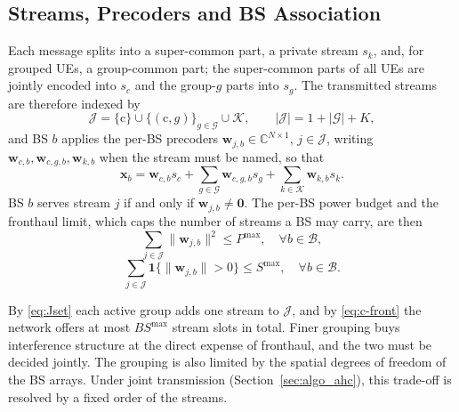 \subsection{Streams, Precoders and BS Association}
Each message splits into a super-common part, a private stream $s_k$, and, for grouped UEs, a group-common part; the super-common parts of all UEs are jointly encoded into $s_c$ and the group-$g$ parts into $s_g$. The transmitted streams are therefore indexed by
\begin{equation} \label{eq:Jset}
\mathcal{J} = \{\mathrm{c}\} \cup \{(\mathrm{c},g)\}_{g\in\mathcal{G}} \cup \mathcal{K}, \qquad |\mathcal{J}| = 1 + |\mathcal{G}| + K,
\end{equation}
and BS $b$ applies the per-BS precoders $\mathbf{w}_{j,b} \in \mathbb{C}^{N\times1}$, $j \in \mathcal{J}$, writing $\mathbf{w}_{c,b}, \mathbf{w}_{c,g,b}, \mathbf{w}_{k,b}$ when the stream must be named, so that
\begin{equation} \label{eq:xb}
\mathbf{x}_b = \mathbf{w}_{c,b} s_c + \sum_{g \in \mathcal{G}} \mathbf{w}_{c,g,b} s_g + \sum_{k \in \mathcal{K}} \mathbf{w}_{k,b} s_k.
\end{equation}
BS $b$ serves stream $j$ if and only if $\mathbf{w}_{j,b} \ne \mathbf{0}$. The per-BS power budget and the fronthaul limit, which caps the number of streams a BS may carry, are then
\begin{equation} \label{eq:c-pow}
\sum_{j \in \mathcal{J}} \lVert\mathbf{w}_{j,b}\rVert^2 \le P^{\max}, \quad \forall b \in \mathcal{B},
\end{equation}
\begin{equation} \label{eq:c-front}
\sum_{j \in \mathcal{J}} \mathbf{1}\big\{\lVert\mathbf{w}_{j,b}\rVert > 0\big\} \le S^{\max}, \quad \forall b \in \mathcal{B}.
\end{equation}

\begin{remark} \label{rem:grouping}
By \eqref{eq:Jset} each active group adds one stream to $\mathcal{J}$, and by \eqref{eq:c-front} the network offers at most $BS^{\max}$ stream slots in total. Finer grouping buys interference structure at the direct expense of fronthaul, and the two must be decided jointly. The grouping is also limited by the spatial degrees of freedom of the BS arrays. Under joint transmission (Section~\ref{sec:algo_ahc}), this trade-off is resolved by a fixed order of the streams.
\end{remark}

